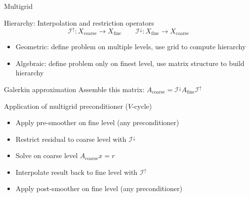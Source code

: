 \begin{frame}[shrink=5]{Multigrid}
  \begin{block}{Hierarchy: Interpolation and restriction operators}
    \begin{equation*}
    \mathcal{I}^\uparrow : X_{\text{coarse}} \to X_{\text{fine}} \qquad
    \mathcal{I}^\downarrow :  X_{\text{fine}} \to X_{\text{coarse}}
  \end{equation*}
  \end{block}
  \begin{itemize}
  \item Geometric: define problem on multiple levels, use grid to compute hierarchy
  \item Algebraic: define problem only on finest level, use matrix structure to build hierarchy
  \end{itemize}
  \begin{block}{Galerkin approximation}
    Assemble this matrix: $A_{\text{coarse}} = \mathcal{I}^\downarrow A_{\text{fine}} \mathcal{I}^\uparrow$
  \end{block}
  \begin{block}{Application of multigrid preconditioner ($V$-cycle)}
    \begin{itemize}
    \item Apply pre-smoother on fine level (any preconditioner)
    \item Restrict residual to coarse level with $\mathcal{I}^\downarrow$
    \item Solve on coarse level $A_{\text{coarse}} x = r$
    \item Interpolate result back to fine level with $\mathcal{I}^\uparrow$
    \item Apply post-smoother on fine level (any preconditioner)
    \end{itemize}
  \end{block}
\end{frame}

